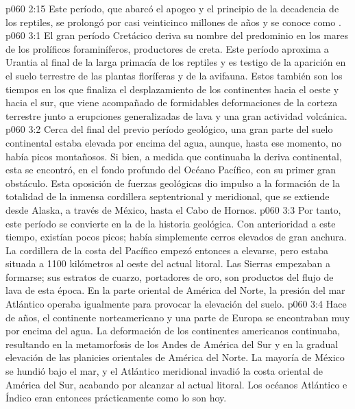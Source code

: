 \vs p060 2:15 \pc Este período, que abarcó el apogeo y el principio de la decadencia de los reptiles, se prolongó por casi veinticinco millones de años y se conoce como .
\vs p060 3:1 El gran período Cretácico deriva su nombre del predominio en los mares de los prolíficos foraminíferos, productores de creta. Este período aproxima a Urantia al final de la larga primacía de los reptiles y es testigo de la aparición en el suelo terrestre de las plantas floríferas y de la avifauna. Estos también son los tiempos en los que finaliza el desplazamiento de los continentes hacia el oeste y hacia el sur, que viene acompañado de formidables deformaciones de la corteza terrestre junto a erupciones generalizadas de lava y una gran actividad volcánica.
\vs p060 3:2 Cerca del final del previo período geológico, una gran parte del suelo continental estaba elevada por encima del agua, aunque, hasta ese momento, no había picos montañosos. Si bien, a medida que continuaba la deriva continental, esta se encontró, en el fondo profundo del Océano Pacífico, con su primer gran obstáculo. Esta oposición de fuerzas geológicas dio impulso a la formación de la totalidad de la inmensa cordillera septentrional y meridional, que se extiende desde Alaska, a través de México, hasta el Cabo de Hornos.
\vs p060 3:3 Por tanto, este período se convierte en la  de la historia geológica. Con anterioridad a este tiempo, existían pocos picos; había simplemente cerros elevados de gran anchura. La cordillera de la costa del Pacífico empezó entonces a elevarse, pero estaba situada a 1100 kilómetros al oeste del actual litoral. Las Sierras empezaban a formarse; sus estratos de cuarzo, portadores de oro, son productos del flujo de lava de esta época. En la parte oriental de América del Norte, la presión del mar Atlántico operaba igualmente para provocar la elevación del suelo.
\vs p060 3:4 \pc Hace  de años, el continente norteamericano y una parte de Europa se encontraban muy por encima del agua. La deformación de los continentes americanos continuaba, resultando en la metamorfosis de los Andes de América del Sur y en la gradual elevación de las planicies orientales de América del Norte. La mayoría de México se hundió bajo el mar, y el Atlántico meridional invadió la costa oriental de América del Sur, acabando por alcanzar al actual litoral. Los océanos Atlántico e Índico eran entonces prácticamente como lo son hoy.

